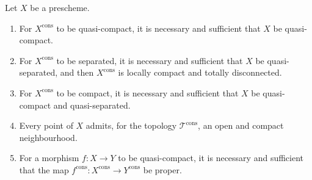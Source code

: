\begin{proposition}[1.9.15]
\label{IV.1.9.15}
Let $X$ be a prescheme.
\begin{enumerate}
  \item[\rm(i)] For $X^{\mathrm{cons}}$ to be quasi-compact, it is necessary and sufficient that $X$ be quasi-compact.
  \item[\rm(ii)] For $X^{\mathrm{cons}}$ to be separated, it is necessary and sufficient that $X$ be quasi-separated, and then $X^{\mathrm{cons}}$ is locally compact and totally disconnected.
  \item[\rm(iii)] For $X^{\mathrm{cons}}$ to be compact, it is necessary and sufficient that $X$ be quasi-compact and quasi-separated.
  \item[\rm(iv)] Every point of $X$ admits, for the topology $\mathscr{T}^{\mathrm{cons}}$, an open and compact neighbourhood.
  \item[\rm(v)] For a morphism $f:X\to Y$ to be quasi-compact, it is necessary and sufficient that the map $f^{\mathrm{cons}}:X^{\mathrm{cons}}\to Y^{\mathrm{cons}}$ be proper.
\end{enumerate}
\end{proposition}

